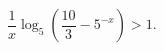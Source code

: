 \begin{ex}[type=inequality]
	\begin{condition}
		$ \dfrac{1}{x}\log_5\left(\dfrac{10}{3} - 5^{-x}\right) > 1 .$
	\end{condition}
\end{ex}